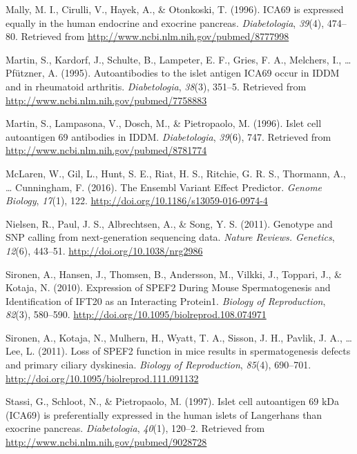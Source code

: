 \documentclass[12pt,twoside]{reedthesis}
\theoremstyle{definition}
\theoremstyle{definition}
\theoremstyle{remark}
\begin{document}
  \hypertarget{ref-Mally1996}{}
  Mally, M. I., Cirulli, V., Hayek, A., \& Otonkoski, T. (1996). ICA69 is
  expressed equally in the human endocrine and exocrine pancreas.
  \emph{Diabetologia}, \emph{39}(4), 474--80. Retrieved from
  \url{http://www.ncbi.nlm.nih.gov/pubmed/8777998}
  
  \hypertarget{ref-Martin1995}{}
  Martin, S., Kardorf, J., Schulte, B., Lampeter, E. F., Gries, F. A.,
  Melchers, I., \ldots{} Pfützner, A. (1995). Autoantibodies to the islet
  antigen ICA69 occur in IDDM and in rheumatoid arthritis.
  \emph{Diabetologia}, \emph{38}(3), 351--5. Retrieved from
  \url{http://www.ncbi.nlm.nih.gov/pubmed/7758883}
  
  \hypertarget{ref-Martin1996}{}
  Martin, S., Lampasona, V., Dosch, M., \& Pietropaolo, M. (1996). Islet
  cell autoantigen 69 antibodies in IDDM. \emph{Diabetologia},
  \emph{39}(6), 747. Retrieved from
  \url{http://www.ncbi.nlm.nih.gov/pubmed/8781774}
  
  \hypertarget{ref-McLaren2016}{}
  McLaren, W., Gil, L., Hunt, S. E., Riat, H. S., Ritchie, G. R. S.,
  Thormann, A., \ldots{} Cunningham, F. (2016). The Ensembl Variant Effect
  Predictor. \emph{Genome Biology}, \emph{17}(1), 122.
  \url{http://doi.org/10.1186/s13059-016-0974-4}
  
  \hypertarget{ref-Nielsen2011}{}
  Nielsen, R., Paul, J. S., Albrechtsen, A., \& Song, Y. S. (2011).
  Genotype and SNP calling from next-generation sequencing data.
  \emph{Nature Reviews. Genetics}, \emph{12}(6), 443--51.
  \url{http://doi.org/10.1038/nrg2986}
  
  \hypertarget{ref-Sironen2010}{}
  Sironen, A., Hansen, J., Thomsen, B., Andersson, M., Vilkki, J.,
  Toppari, J., \& Kotaja, N. (2010). Expression of SPEF2 During Mouse
  Spermatogenesis and Identification of IFT20 as an Interacting Protein1.
  \emph{Biology of Reproduction}, \emph{82}(3), 580--590.
  \url{http://doi.org/10.1095/biolreprod.108.074971}
  
  \hypertarget{ref-Sironen2011}{}
  Sironen, A., Kotaja, N., Mulhern, H., Wyatt, T. A., Sisson, J. H.,
  Pavlik, J. A., \ldots{} Lee, L. (2011). Loss of SPEF2 function in mice
  results in spermatogenesis defects and primary ciliary dyskinesia.
  \emph{Biology of Reproduction}, \emph{85}(4), 690--701.
  \url{http://doi.org/10.1095/biolreprod.111.091132}
  
  \hypertarget{ref-Stassi1997}{}
  Stassi, G., Schloot, N., \& Pietropaolo, M. (1997). Islet cell
  autoantigen 69 kDa (ICA69) is preferentially expressed in the human
  islets of Langerhans than exocrine pancreas. \emph{Diabetologia},
  \emph{40}(1), 120--2. Retrieved from
  \url{http://www.ncbi.nlm.nih.gov/pubmed/9028728}
  
\end{document}
